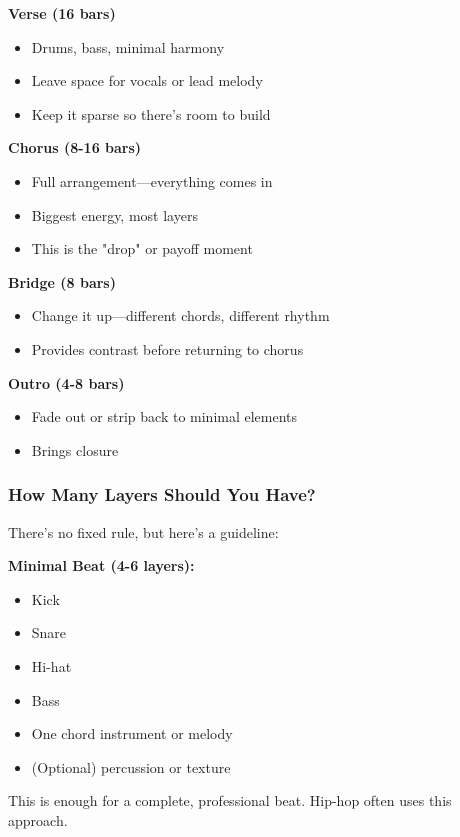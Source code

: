 \documentclass[11pt,letterpaper]{article}
\begin{document}
\textbf{Verse (16 bars)}
\begin{itemize}[leftmargin=*]
\item Drums, bass, minimal harmony
\item Leave space for vocals or lead melody
\item Keep it sparse so there's room to build
\end{itemize}

\textbf{Chorus (8-16 bars)}
\begin{itemize}[leftmargin=*]
\item Full arrangement—everything comes in
\item Biggest energy, most layers
\item This is the "drop" or payoff moment
\end{itemize}

\textbf{Bridge (8 bars)}
\begin{itemize}[leftmargin=*]
\item Change it up—different chords, different rhythm
\item Provides contrast before returning to chorus
\end{itemize}

\textbf{Outro (4-8 bars)}
\begin{itemize}[leftmargin=*]
\item Fade out or strip back to minimal elements
\item Brings closure
\end{itemize}

\subsubsection{How Many Layers Should You Have?}

There's no fixed rule, but here's a guideline:

\textbf{Minimal Beat (4-6 layers):}
\begin{itemize}[leftmargin=*]
\item Kick
\item Snare
\item Hi-hat
\item Bass
\item One chord instrument or melody
\item (Optional) percussion or texture
\end{itemize}

This is enough for a complete, professional beat. Hip-hop often uses this approach.
\end{document}

